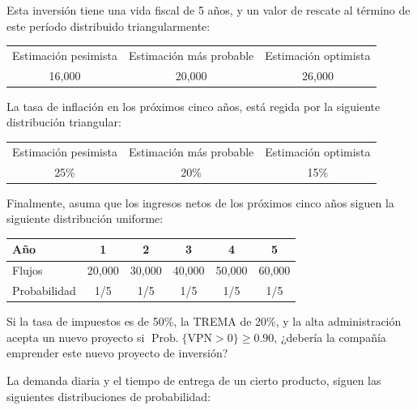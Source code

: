 \documentclass[11pt,letterpaper]{report}
\newcommand{\Prob}{\operatorname{Prob.}}
\begin{document}
\begin{description}[leftmargin=1.2cm,style=nextline]
Esta inversión tiene una vida fiscal de 5 años, y un valor de rescate al
término de este período distribuido triangularmente:

\begin{center}
\begin{tabular}{ccc}
Estimación pesimista & Estimación más probable & Estimación optimista \\
16{,}000 & 20{,}000 & 26{,}000 \\
\end{tabular}
\end{center}

La tasa de inflación en los próximos cinco años, está regida por la siguiente
distribución triangular:

\begin{center}
\begin{tabular}{ccc}
Estimación pesimista & Estimación más probable & Estimación optimista \\
25\% & 20\% & 15\% \\
\end{tabular}
\end{center}

Finalmente, asuma que los ingresos netos de los próximos cinco años siguen la
siguiente distribución uniforme:

\begin{center}
\begin{tabular}{lccccc}
Año & 1 & 2 & 3 & 4 & 5 \\
\midrule
Flujos & 20{,}000 & 30{,}000 & 40{,}000 & 50{,}000 & 60{,}000 \\
Probabilidad & 1/5 & 1/5 & 1/5 & 1/5 & 1/5 \\
\end{tabular}
\end{center}

Si la tasa de impuestos es de 50\%, la TREMA de 20\%, y la alta
administración acepta un nuevo proyecto si $\Prob\{\text{VPN} > 0\} \ge 0.90$,
¿debería la compañía emprender este nuevo proyecto de inversión?

\item[5.10.] La demanda diaria y el tiempo de entrega de un cierto producto,
siguen las siguientes distribuciones de probabilidad:


\end{description}
\end{document}
